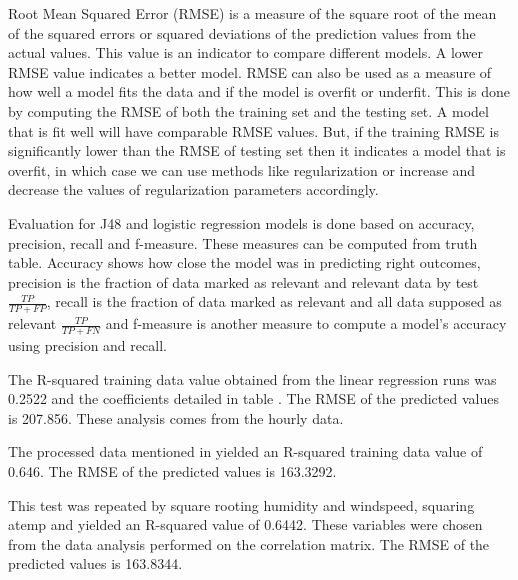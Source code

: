 \documentclass[12pt]{article}
\begin{document}
Root Mean Squared Error (RMSE) is a measure of the square root of the mean of
the squared errors or squared deviations of the prediction values from the
actual values. This value is an indicator to compare different models. A lower
RMSE value indicates a better model.  RMSE can also be used as a measure of how
well a model fits the data and if the model is overfit or underfit. This is
done by computing the RMSE of both the training set and the testing set. A
model that is fit well will have comparable RMSE values. But, if the training
RMSE is significantly lower than the RMSE of testing set then it indicates a
model that is overfit, in which case we can use methods like regularization or
increase and decrease the values of regularization parameters accordingly.


            
Evaluation for J48 and logistic regression models is done based on accuracy,
precision, recall and f-measure. These measures can be computed from truth
table. Accuracy shows how close the model was in predicting right outcomes,
precision is the fraction of data marked as relevant and relevant data by test
$\frac{TP}{TP + FP}$, recall is the fraction of data marked as relevant and all
data supposed as relevant $\frac{TP}{TP + FN}$ and f-measure is another measure
to compute a model’s accuracy using precision and recall.






The R-squared training data value obtained from the linear regression runs was
0.2522 and the coefficients detailed in table .  The RMSE
of the predicted values is 207.856.  These analysis comes from the hourly data.

The processed data mentioned in  yielded an R-squared
training data value of 0.646.  The RMSE of the predicted values is 163.3292.

This test was repeated by square rooting humidity and windspeed, squaring atemp
and yielded an R-squared value of 0.6442.  These variables were chosen from the
data analysis performed on the correlation matrix.  The RMSE of the predicted
values is 163.8344.
\end{document}
